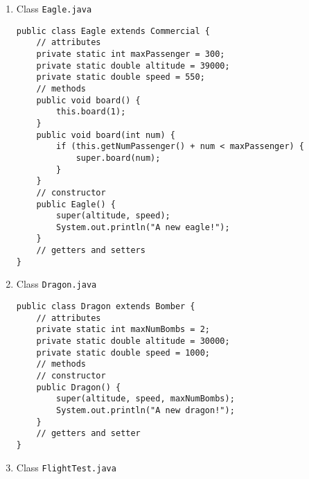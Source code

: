 \begin{enumerate}
\item Class \texttt{Eagle.java}

\lstset{language=java,tabsize=2}
\begin{lstlisting}
public class Eagle extends Commercial {
	// attributes
	private static int maxPassenger = 300;
	private static double altitude = 39000;
	private static double speed = 550;
	// methods
	public void board() {
		this.board(1);
	}
	public void board(int num) {
		if (this.getNumPassenger() + num < maxPassenger) {
			super.board(num);
		}
	}
	// constructor
	public Eagle() {
		super(altitude, speed);
		System.out.println("A new eagle!");
	}
	// getters and setters
}
\end{lstlisting}

\item Class \texttt{Dragon.java}

\lstset{language=java,tabsize=2}
\begin{lstlisting}
public class Dragon extends Bomber {
	// attributes
	private static int maxNumBombs = 2;
	private static double altitude = 30000;
	private static double speed = 1000;
	// methods
	// constructor
	public Dragon() {
		super(altitude, speed, maxNumBombs);
		System.out.println("A new dragon!");
	}
	// getters and setter
}
\end{lstlisting}

\item Class \texttt{FlightTest.java}


\end{enumerate}
